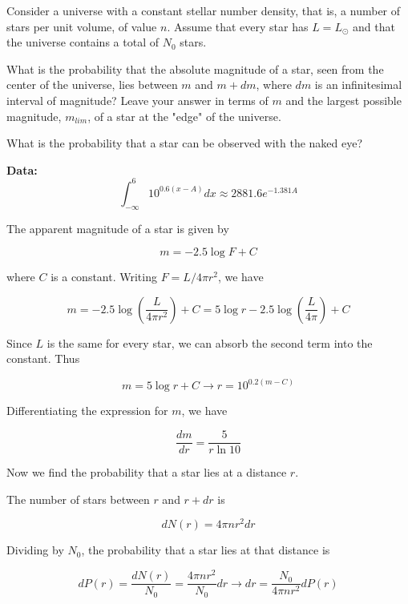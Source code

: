 \documentclass[11pt]{article}
\begin{document}
\begin{pproblem}
    Consider a universe with a constant stellar number density, that is, a number of stars per unit volume, of value \(n\). Assume that every star has \(L = L_\odot\) and that the universe contains a total of \(N_0\) stars.
    
    \begin{alternativas}
    \item What is the probability that the absolute magnitude of a star, seen from the center of the universe, lies between \(m\) and \(m+dm\), where \(dm\) is an infinitesimal interval of magnitude? Leave your answer in terms of \(m\) and the largest possible magnitude, \(m_{lim}\), of a star at the "edge" of the universe.

    \item What is the probability that a star can be observed with the naked eye?
    
    \textbf{Data:} \[\int_{-\infty}^{6}10^{0.6(x-A)}dx \approx 2881.6 e^{-1.381 A}\]
    \end{alternativas}
\begin{pssolution*}{}{}
    \begin{alternativas}
    \item The apparent magnitude of a star is given by

    \[m = -2.5\log F + C\]

    where \(C\) is a constant. Writing \(F = L/4\pi r^2\), we have

    \[m = -2.5\log\left(\frac{L}{4\pi r^2}\right) + C = 5\log r -2.5 \log \left(\frac{L}{4\pi}\right)+ C\]

    Since \(L\) is the same for every star, we can absorb the second term into the constant. Thus

    \[m=5\log r + C \rightarrow r = 10^{0.2(m-C)}\]

    Differentiating the expression for \(m\), we have

    \[\frac{dm}{dr} = \frac{5}{r\ln 10}\]

    Now we find the probability that a star lies at a distance \(r\).

    The number of stars between \(r\) and \(r+dr\) is

    \[dN(r) = 4\pi n r^2dr\]

    Dividing by \(N_0\), the probability that a star lies at that distance is

    \[dP(r) = \frac{dN(r)}{N_0} = \frac{4\pi n r^2}{N_0}dr \rightarrow dr = \frac{N_0}{4\pi n r^2} dP(r)\]


\end{alternativas}
\end{pssolution*}
\end{pproblem}
\end{document}
